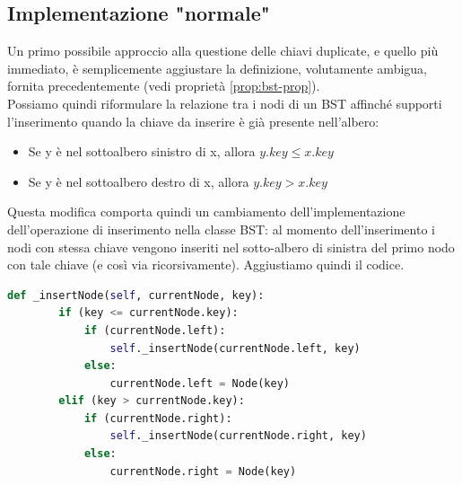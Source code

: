 \documentclass{article}
\begin{document}
 
 
\subsection{Implementazione "normale"}\label{subsec:normal-implementation}
Un primo possibile approccio alla questione delle chiavi duplicate, e quello più immediato, è semplicemente aggiustare la definizione, volutamente ambigua, fornita precedentemente (vedi proprietà \ref{prop:bst-prop}).\\
Possiamo quindi riformulare la relazione tra i nodi di un BST affinché supporti l'inserimento quando la chiave da inserire è già presente nell'albero:

\begin{center}
\begin{mybox}
	\begin{itemize}
    \item Se y è nel sottoalbero sinistro di x, allora \(y.key \le x.key\) 
     \item Se y è nel sottoalbero destro di x, allora \(y.key > x.key\) 
	\end{itemize}
\end{mybox}
\end{center}
\label{prop:bst-normal-implementation-prop}

Questa modifica comporta quindi un cambiamento dell'implementazione dell'operazione di inserimento nella classe BST: al momento dell'inserimento i nodi con stessa chiave vengono inseriti nel sotto-albero di sinistra del primo nodo con tale chiave (e così via ricorsivamente). Aggiustiamo quindi il codice.

\begin{lstlisting}[language=Python, caption={Funzione ausiliaria di inserimento aggiornata}]
    def _insertNode(self, currentNode, key):
        if (key <= currentNode.key):
            if (currentNode.left):
                self._insertNode(currentNode.left, key)
            else:
                currentNode.left = Node(key)
        elif (key > currentNode.key):
            if (currentNode.right):
                self._insertNode(currentNode.right, key)
            else:
                currentNode.right = Node(key)
\end{lstlisting}
\end{document}

